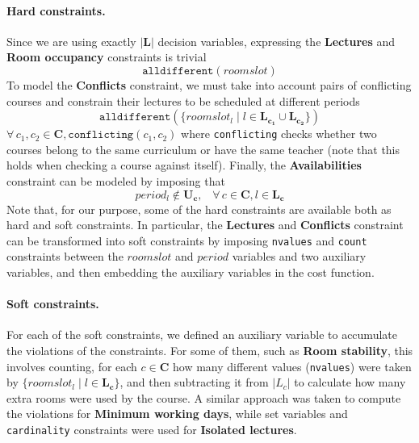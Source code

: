 \documentclass{llncs}
\newcommand{\code}[1]{\texttt{#1}}
\begin{document}
\paragraph{Hard constraints.} Since we are using exactly $|\mathbf{L}|$ decision variables, expressing the \textbf{Lectures} and \textbf{Room occupancy} constraints is trivial
%
\begin{equation*}
    \code{alldifferent}(roomslot)
\end{equation*}
%
\noindent
To model the \textbf{Conflicts} constraint, we must take into account pairs of conflicting courses and constrain their lectures to be scheduled at different periods
%
\begin{equation*}
    \code{alldifferent}(\{roomslot_l \mid l \in \mathbf{L_{c_1}}\!\cup\mathbf{L_{c_2}}\}) 
\end{equation*}
%
\noindent
$\forall \, c_1, c_2 \in \mathbf{C}, \code{conflicting}\left(c_1,c_2\right)$ where \code{conflicting} checks whether two courses belong to the same curriculum or have the same teacher (note that this holds when checking a course against itself).
%
Finally, the \textbf{Availabilities} constraint can be modeled by imposing that 
%
\begin{equation*}
    period_{l} \not\in \mathbf{U_c}, \;\;\;  \forall \, c \in \mathbf{C}, l \in \mathbf{L_c}
\end{equation*}
%
\noindent
Note that, for our purpose, some of the hard constraints are available both as hard and soft constraints. In particular, the \textbf{Lectures} and \textbf{Conflicts} constraint can be transformed into soft constraints by imposing \code{nvalues} and \code{count} constraints between the $roomslot$ and $period$ variables and two auxiliary variables, and then embedding the auxiliary variables in the cost function.

\paragraph{Soft constraints.}

For each of the soft constraints, we defined an auxiliary variable to accumulate the violations of the constraints. For some of them, such as \textbf{Room stability}, this involves counting, for each $c \in \mathbf{C}$ how many different values (\code{nvalues}) were taken by $\{roomslot_l \mid l \in \mathbf{L_c}\}$, and then subtracting it from $|L_c|$ to calculate how many extra rooms were used by the course. A similar approach was taken to compute the violations for \textbf{Minimum working days}, while set variables and \code{cardinality} constraints were used for \textbf{Isolated lectures}.
\end{document}
